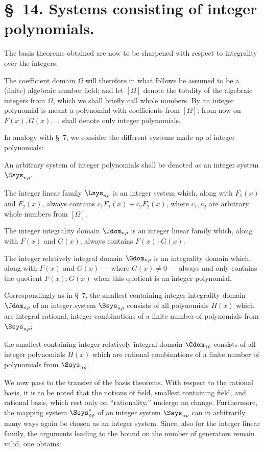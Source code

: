 \documentclass[11pt]{article}
\begin{document}
\section*{\S\ 14. Systems consisting of integer polynomials.}

The basis theorems obtained are now to be sharpened with respect to integrality over the integers.

The coefficient domain $\Omega$ will therefore in what follows be assumed to be a (finite) algebraic number field; and let $[\Omega]$ denote the totality of the algebraic integers from $\Omega$, which we shall briefly call whole numbers. By an integer polynomial is meant a polynomial with coefficients from $[\Omega]$; from now on $F(x),G(x),\ldots$ shall denote only integer polynomials.

In analogy with \S\ 7, we consider the different systems made up of integer polynomials:

An arbitrary system of integer polynomials shall be denoted as an integer system $\Ssys_{n\rho}$.

The integer linear family $\Lsys_{n\rho}$ is an integer system which, along with $F_1(x)$ and $F_2(x)$, always contains $c_1F_1(x)+c_2F_2(x)$, where $c_1,c_2$ are arbitrary whole numbers from $[\Omega]$.

The integer integrality domain $\Jdom_{n\rho}$ is an integer linear family which, along with $F(x)$ and $G(x)$, always contains $F(x)\cdot G(x)$.

The integer relatively integral domain $\Gdom_{n\rho}$ is an integrality domain which, along with $F(x)$ and $G(x)$ --- where $G(x)\ne0$ --- always and only contains the quotient $F(x):G(x)$ when this quotient is an integer polynomial.

Correspondingly as in \S\ 7, the smallest containing integer integrality domain $\Jdom_{n\rho}$ of an integer system $\Ssys_{n\rho}$ consists of all polynomials $H(x)$ which are integral rational, integer combinations of a finite number of polynomials from $\Ssys_{n\rho}$;

the smallest containing integer relatively integral domain $\Gdom_{n\rho}$ consists of all integer polynomials $H(x)$ which are rational combinations of a finite number of polynomials from $\Ssys_{n\rho}$.

We now pass to the transfer of the basis theorems. With respect to the rational basis, it is to be noted that the notions of field, smallest containing field, and rational basis, which rest only on ``rationality,'' undergo no change. Furthermore, the mapping system $\Ssys^*_{\rho\rho}$ of an integer system $\Ssys_{n\rho}$ can in arbitrarily many ways again be chosen as an integer system. Since, also for the integer linear family, the arguments leading to the bound on the number of generators remain valid, one obtains:
\end{document}
